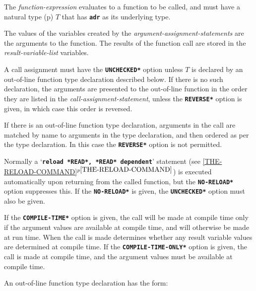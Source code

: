 \documentclass[12pt]{article}
\makeatletter
\newcommand{\TT}[1]{{\tt \bfseries #1}}
\newcommand{\ttakey}[1]{\TT{*#1*}\index{#1@{\tt *#1*}}}
\newcommand{\itemref}[1]{\ref{#1}$^{p\pageref{#1}}$}
\newcommand{\pagref}[1]{p\pageref{#1}}
\makeatother
\begin{document}
The {\em function-expression} evaluates to a function to be called,
and must have a natural type (\pagref{NATURAL-TYPE})
$T$ that has \TT{adr} as its underlying type.

The values of the variables created by the {\em argument-assignment-statements}
are the arguments to the function.
The results of the function call are stored in the
{\em result-variable-list} variables.

A call assignment must have the \TT{*UNCHECKED*} option
unless $T$ is declared by an out-of-line
function type declaration described below.  If there is no
such declaration, the arguments are presented to the out-of-line
function in the order they are listed in the {\em call-assignment-statement},
unless the \TT{*REVERSE*} option is given, in which case this order
is reversed.

If there is an out-of-line function type declaration, arguments in the
call are matched by name to arguments in the type declaration,
and then ordered as per the type declaration.  In this case
the \TT{*REVERSE*} option is not permitted.

Normally a `\TT{reload *READ*, *READ* dependent}'
statement (see \itemref{THE-RELOAD-COMMAND})
is executed automatically
upon returning from the called function, but the
\ttakey{NO-RELOAD} option suppresses this.
If the \TT{*NO-RELOAD*} is given, the \TT{*UNCHECKED*} option must
also be given.

If the \TT{*COMPILE-TIME*} option is given, the call
will be made at compile time only if the argument values are available
at compile time, and will otherwise be made at run time.  When the call
is made determines whether any result variable values are determined
at compile time.  If the \TT{*COMPILE-TIME-ONLY*} option is given,
the call is made at compile time, and the argument values must be
available at compile time.

An out-of-line function type declaration has the form:
\end{document}
